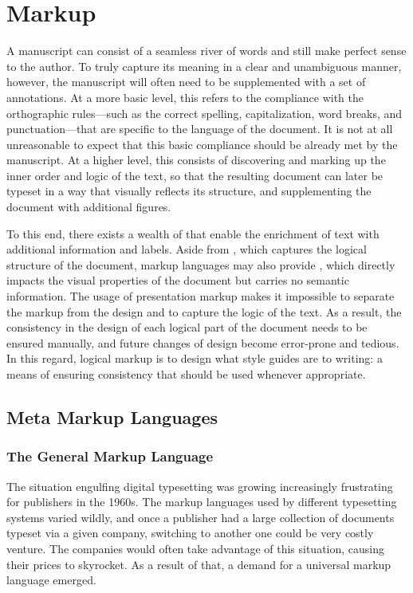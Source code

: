 \documentclass{book}
\begin{document}
\chapter{Markup}
A manuscript can consist of a seamless river of words and still make perfect
sense to the author. To truly capture its meaning in a clear and unambiguous
manner, however, the manuscript will often need to be supplemented with a set of
annotations. At a more basic level, this refers to the compliance with the
orthographic rules---such as the correct spelling, capitalization, word breaks,
and punctuation---that are specific to the language of the document.  It is not
at all unreasonable to expect that this basic compliance should be already met
by the manuscript. At a higher level, this consists of discovering and marking
up the inner order and logic of the text, so that the resulting document can
later be typeset in a way that visually reflects its structure, and
supplementing the document with additional figures.

To this end, there exists a wealth of  that enable the
enrichment of text with additional information and labels. Aside from
, which captures the logical structure of the document, markup
languages may also provide , which directly impacts
the visual properties of the document but carries no semantic information. The
usage of presentation markup makes it impossible to separate the markup from the
design and to capture the logic of the text. As a result, the consistency in the
design of each logical part of the document needs to be ensured manually, and
future changes of design become error-prone and tedious. In this regard, logical
markup is to design what style guides are to writing: a means of ensuring
consistency that should be used whenever appropriate.

\section{Meta Markup Languages}
\subsection{The General Markup Language}
The situation engulfing digital typesetting was growing increasingly frustrating
for publishers in the 1960s. The markup languages used by different typesetting
systems varied wildly, and once a publisher had a large collection of documents
typeset via a given company, switching to another one could be very costly
venture. The companies would often take advantage of this situation, causing
their prices to skyrocket. As a result of that, a demand for a universal markup
language emerged.
\end{document}
